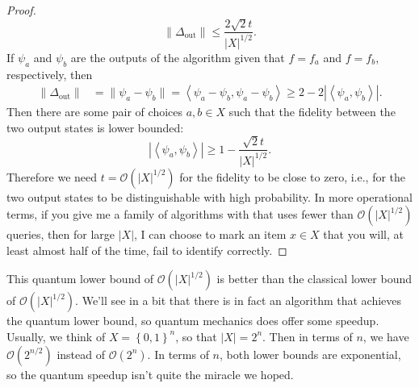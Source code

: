 \documentclass[]{article}
\newcommand{\norm}[1]{\|#1\|}
\newcommand{\modulus}[1]{\left\vert#1\right\vert}
\newcommand{\set}[1]{\left\lbrace#1\right\rbrace}
\newcommand{\brak}[1]{\left\langle#1\right\rangle}
\theoremstyle{plain}
\theoremstyle{definition}
\theoremstyle{remark}
\begin{document}
\begin{proof}
\begin{equation}
\norm{\Delta_\text{out}}\leq \frac{2\sqrt{2}t}{\modulus{X}^{1/2}}.
\end{equation}
If $\psi_a$ and $\psi_b$ are the outputs of the algorithm given that $f=f_a$ and $f=f_b$, respectively, then
\begin{equation}
\begin{aligned}
\norm{\Delta_\text{out}}&=\norm{\psi_a-\psi_b}=\brak{\psi_a-\psi_b,\psi_a-\psi_b}\geq 2-2\modulus{\brak{\psi_a,\psi_b}}.
\end{aligned}
\end{equation}
Then there are some pair of choices $a,b\in X$ such that the fidelity between the two output states is lower bounded:
\begin{equation}
\modulus{\brak{\psi_a,\psi_b}}\geq 1-\frac{\sqrt{2}t}{\modulus{X}^{1/2}}.
\end{equation}
Therefore we need $t=\mathcal{O}(\modulus{X}^{1/2})$ for the fidelity to be close to zero, i.e., for the two output states to be distinguishable with high probability. In more operational terms, if you give me a family of algorithms with that uses fewer than $\mathcal{O}(\modulus{X}^{1/2})$ queries, then for large $\modulus{X}$, I can choose to mark an item $x\in X$ that you will, at least almost half of the time, fail to identify correctly.
\end{proof}
\noindent This quantum lower bound of $\mathcal{O}(\modulus{X}^{1/2})$ is better than the classical lower bound of $\mathcal{O}(\modulus{X}^{1/2})$. We'll see in a bit that there is in fact an algorithm that achieves the quantum lower bound, so quantum mechanics does offer some speedup. Usually, we think of $X=\set{0,1}^n$, so that $\modulus{X}=2^n$. Then in terms of $n$, we have $\mathcal{O}(2^{n/2})$ instead of $\mathcal{O}(2^n)$. In terms of $n$, both lower bounds are exponential, so the quantum speedup isn't quite the miracle we hoped.
\end{document}
